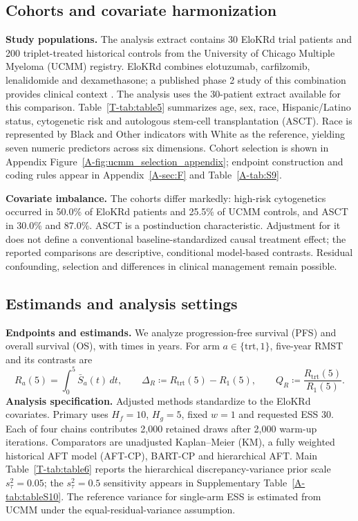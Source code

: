 \documentclass[11pt]{article}
\begin{document}
\subsection{Cohorts and covariate harmonization}
\noindent\textbf{Study populations.}
The analysis extract contains 30 EloKRd trial patients and 200 triplet-treated historical controls from the University of Chicago Multiple Myeloma (UCMM) registry. EloKRd combines elotuzumab, carfilzomib, lenalidomide and dexamethasone; a published phase 2 study of this combination provides clinical context \citep{Derman2022}. The analysis uses the 30-patient extract available for this comparison. Table~\ref{T-tab:table5} summarizes age, sex, race, Hispanic/Latino status, cytogenetic risk and autologous stem-cell transplantation (ASCT). Race is represented by Black and Other indicators with White as the reference, yielding seven numeric predictors across six dimensions. Cohort selection is shown in Appendix Figure~\ref{A-fig:ucmm_selection_appendix}; endpoint construction and coding rules appear in Appendix~\ref{A-sec:F} and Table~\ref{A-tab:S9}.

\noindent\textbf{Covariate imbalance.}
The cohorts differ markedly: high-risk cytogenetics occurred in 50.0\% of EloKRd patients and 25.5\% of UCMM controls, and ASCT in 30.0\% and 87.0\%. ASCT is a postinduction characteristic. Adjustment for it does not define a conventional baseline-standardized causal treatment effect; the reported comparisons are descriptive, conditional model-based contrasts. Residual confounding, selection and differences in clinical management remain possible.

\subsection{Estimands and analysis settings}
\noindent\textbf{Endpoints and estimands.}
We analyze progression-free survival (PFS) and overall survival (OS), with times in years. For arm $a\in\{\mathrm{trt},1\}$, five-year RMST and its contrasts are
\begin{equation}\label{eq:rmst}
R_a(5)=\int_0^5\bar S_a(t)\,dt,\qquad
\Delta_R\coloneqq R_{\mathrm{trt}}(5)-R_1(5),\qquad Q_R\coloneqq \frac{R_{\mathrm{trt}}(5)}{R_1(5)}.
\end{equation}
\noindent\textbf{Analysis specification.}
Adjusted methods standardize to the EloKRd covariates. Primary \lrc{} uses $H_f=10$, $H_g=5$, fixed $w=1$ and requested ESS 30. Each of four chains contributes 2,000 retained draws after 2,000 warm-up iterations. Comparators are unadjusted Kaplan--Meier (KM), a fully weighted historical AFT model (AFT-CP), BART-CP and hierarchical AFT. Main Table~\ref{T-tab:table6} reports the hierarchical discrepancy-variance prior scale $s_\tau^2=0.05$; the $s_\tau^2=0.5$ sensitivity appears in Supplementary Table~\ref{A-tab:tableS10}. The reference variance for single-arm ESS is estimated from UCMM under the equal-residual-variance assumption.
\end{document}
